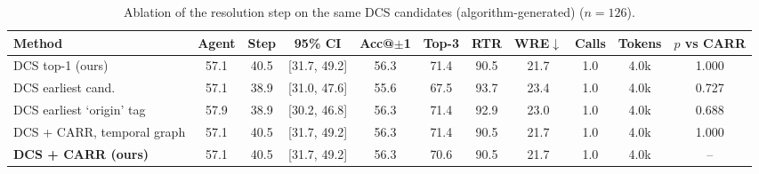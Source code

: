 \begin{table}[t]
\centering
\caption{Ablation of the resolution step on the same DCS candidates (algorithm-generated) ($n=126$).}
\label{tab:ablation}
\footnotesize
\setlength{\tabcolsep}{4pt}
\begin{tabular}{@{}lcccccccccc@{}}
\toprule
Method & Agent & Step & 95\% CI & Acc@$\pm$1 & Top-3 & RTR & WRE$\downarrow$ & Calls & Tokens & $p$ vs CARR \\
\midrule
DCS top-1 (ours) & 57.1 & 40.5 & [31.7, 49.2] & 56.3 & 71.4 & 90.5 & 21.7 & 1.0 & 4.0k & 1.000 \\
DCS earliest cand. & 57.1 & 38.9 & [31.0, 47.6] & 55.6 & 67.5 & 93.7 & 23.4 & 1.0 & 4.0k & 0.727 \\
DCS earliest `origin' tag & 57.9 & 38.9 & [30.2, 46.8] & 56.3 & 71.4 & 92.9 & 23.0 & 1.0 & 4.0k & 0.688 \\
DCS + CARR, temporal graph & 57.1 & 40.5 & [31.7, 49.2] & 56.3 & 71.4 & 90.5 & 21.7 & 1.0 & 4.0k & 1.000 \\
\textbf{DCS + CARR (ours)} & 57.1 & 40.5 & [31.7, 49.2] & 56.3 & 70.6 & 90.5 & 21.7 & 1.0 & 4.0k & -- \\
\bottomrule
\end{tabular}
\end{table}